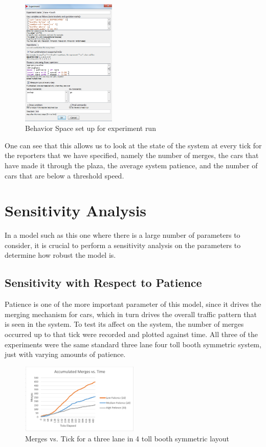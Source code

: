 \documentclass{article}
\begin{document}
\begin{figure}[H]
    \centering
    \includegraphics[width=0.4\textwidth]{behaviorspace.png}
    \caption[width=0.8\textwidth]{Behavior Space set up for experiment run}
\end{figure}

One can see that this allows us to look at the state of the system at every tick for the reporters that we have specified, namely the number of merges, the cars that have made it through the plaza, the average system patience, and the number of cars that are below a threshold speed.

\section{Sensitivity Analysis}
In a model such as this one where there is a large number of parameters to consider, it is crucial to perform a sensitivity analysis on the parameters to determine how robust the model is.

\subsection{Sensitivity with Respect to Patience}
Patience is one of the more important parameter of this model, since it drives the merging mechanism for cars, which in turn drives the overall traffic pattern that is seen in the system. To test its affect on the system, the number of merges occurred up to that tick were recorded and plotted against time. All three of the experiments were the same standard three lane four toll booth symmetric system, just with varying amounts of patience.

\begin{figure}[H]
    \centering
    \includegraphics[width=0.5\textwidth]{patienceSA.PNG}
    \caption[width=0.8\textwidth]{Merges vs. Tick for a three lane in 4 toll booth symmetric layout}
\end{figure}
\end{document}
